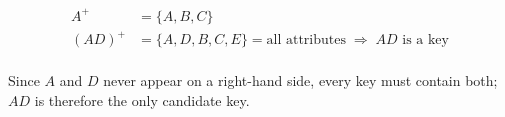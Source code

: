 \begin{formulas}
\begin{align*}
A^{+} &= \{A, B, C\}\\
(AD)^{+} &= \{A, D, B, C, E\} = \text{all attributes} \;\Rightarrow\; AD \text{ is a key}\\
\end{align*}
\end{formulas}
\noindent Since $A$ and $D$ never appear on a right-hand side, every key must contain both; $AD$ is therefore the only candidate key.

